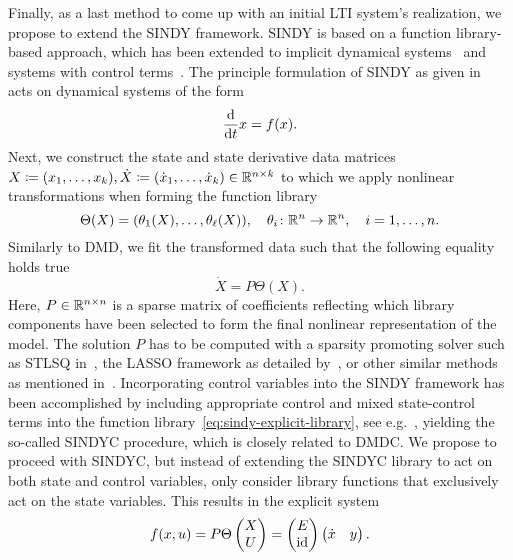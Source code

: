 Finally, as a last method to come up with an initial \ac{LTI} system's realization, we propose to extend the \ac{SINDY} framework.
\ac{SINDY} is based on a function library-based approach, which has been extended to implicit dynamical systems~\cite{Mangan2016, Kaheman2020} and systems with control terms~\cite{Kaiser2018}.
The principle formulation of \ac{SINDY} as given in~\cite{Brunton2016} acts on dynamical systems of the form
\begin{equation}\label{eq:sindy-explicit-dynamical-system}
    \frac{\mathop{}\!\mathrm{d}}{\mathop{}\!\mathrm{d} t} x = f(x).
\end{equation}
Next, we construct the state and state derivative data matrices $X \coloneqq (x_1, \dots, x_k), \dot{X} \coloneqq (\dot{x}_1, \dots, \dot{x}_k) \in \mathbb{R}^{n \times k}$ to which we apply nonlinear transformations when forming the function library
\begin{equation}\label{eq:sindy-explicit-library}
    \Theta(X) = (\theta_1(X), \dots, \theta_\ell(X)),\quad \theta_i \colon \mathbb{R}^n \to \mathbb{R}^n,\quad i = 1, \dots, n.
\end{equation}
Similarly to \ac{DMD}, we fit the transformed data such that the following equality holds true
\begin{equation}\label{eq:sindy-explicit-fit}
    \dot{X} = P \Theta(X).
\end{equation}
Here, $P \in \mathbb{R}^{n \times n}$ is a sparse matrix of coefficients reflecting which library components have been selected to form the final nonlinear representation of the model.
The solution $P$ has to be computed with a sparsity promoting solver such as \ac{STLSQ} in~\cite{Zhang2019}, the LASSO framework as detailed by~\cite{Tibshirani1996}, or other similar methods as mentioned in~\cite{Kaiser2018, Kaheman2020}.
Incorporating control variables into the \ac{SINDY} framework has been accomplished by including appropriate control and mixed state-control terms into the function library~\eqref{eq:sindy-explicit-library}, see e.g.~\cite{Kaiser2018}, yielding the so-called \ac{SINDYC} procedure, which is closely related to \ac{DMDC}.
We propose to proceed with \ac{SINDYC}, but instead of extending the \ac{SINDYC} library to act on both state and control variables, only consider library functions that exclusively act on the state variables.
This results in the explicit system
\begin{equation}\label{eq:sindy-io}
    f(x, u) = P \Theta \begin{pmatrix}
        X \\
        U
    \end{pmatrix} = \begin{pmatrix}
        E \\
        \text{id}_{}
    \end{pmatrix} \begin{pmatrix}
        \dot{x} & y
    \end{pmatrix}.
\end{equation}
